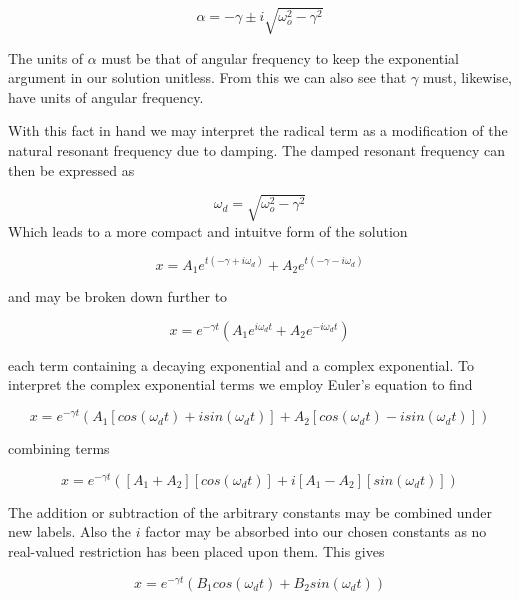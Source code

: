 \documentclass[11pt]{book}
\begin{document}
\begin{equation*}
  \alpha = -\gamma \pm i\sqrt{\omega_o^2 - \gamma^2}
\end{equation*}

The units of $\alpha$ must be that of angular frequency to keep the
exponential argument in our solution unitless.  From this we can also
see that $\gamma$ must, likewise, have units of angular frequency.

With this fact in hand we may interpret the radical term as a
modification of the natural resonant frequency due to damping.  The
damped resonant frequency can then be expressed as

\begin{equation*}
  \omega_d = \sqrt{\omega_o^2 - \gamma^2}
\end{equation*}
Which leads to a more compact and intuitve form of the solution

\begin{equation*}
  x = A_1e^{t(-\gamma + i\omega_d)} + A_2e^{t(-\gamma - i\omega_d)}
\end{equation*}

and may be broken down further to

\begin{equation*}
  x = e^{-\gamma t}(A_1e^{i \omega_d t} + A_2e^{ - i \omega_d t})
\end{equation*}

each term containing a decaying exponential and a complex exponential.
To interpret the complex exponential terms we employ Euler's equation
to find

\begin{equation*}
  x = e^{-\gamma t}(A_1[cos(\omega_d t) + i sin(\omega_d t)] + A_2[cos(\omega_d t) - i sin(\omega_d t)])
\end{equation*}

combining terms

\begin{equation*}
  x = e^{-\gamma t}([A_1 + A_2][cos(\omega_d t)] + i [A_1 - A_2][sin(\omega_d t)])
\end{equation*}

The addition or subtraction of the arbitrary constants may be combined
under new labels.  Also the $i$ factor may be absorbed into our chosen
constants as no real-valued restriction has been placed upon them.
This gives

\begin{equation*}
  x = e^{- \gamma t}(B_1cos(\omega_d t) + B_2sin(\omega_d t))
\end{equation*}
\end{document}
